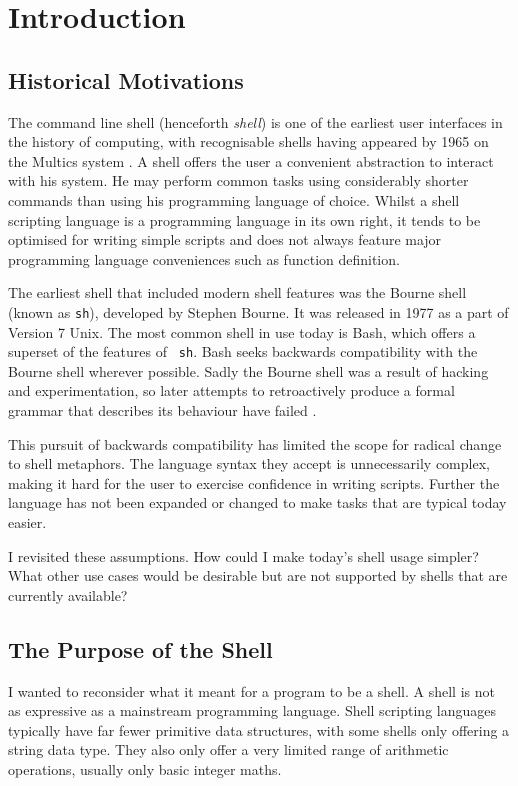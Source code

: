 \documentclass[12pt,twoside,notitlepage]{report}
\begin{document}
\cleardoublepage        %

\setcounter{page}{1}
\pagestyle{headings}

\chapter{Introduction}

\section{Historical Motivations}
The command line shell (henceforth \emph{shell}) is one of the
earliest user interfaces in the history of computing, with
recognisable shells having appeared by 1965 on the Multics system
\cite{multics}. A shell offers the user a convenient abstraction to
interact with his system. He may perform common tasks using
considerably shorter commands than using his programming language of
choice. Whilst a shell scripting language is a programming language in
its own right, it tends to be optimised for writing simple scripts and
does not always feature major programming language conveniences such
as function definition.

The earliest shell that included modern shell features was the Bourne
shell (known as {\tt sh}), developed by Stephen Bourne. It was
released in 1977 as a part of Version 7 Unix. The most common shell in
use today is Bash, which offers a superset of the features of {\tt
  sh}. Bash seeks backwards compatibility with the Bourne shell
wherever possible. Sadly the Bourne shell was a result of hacking and
experimentation, so later attempts to retroactively produce a formal
grammar that describes its behaviour have failed \cite{bourne}.

This pursuit of backwards compatibility has limited the scope for
radical change to shell metaphors. The language syntax they accept is
unnecessarily complex, making it hard for the user to exercise
confidence in writing scripts. Further the language has not been
expanded or changed to make tasks that are typical today easier.

I revisited these assumptions. How could I make today's shell usage
simpler? What other use cases would be desirable but are not supported
by shells that are currently available?

\section{The Purpose of the Shell}
I wanted to reconsider what it meant for a program to be a shell. A
shell is not as expressive as a mainstream programming language. Shell
scripting languages typically have far fewer primitive data
structures, with some shells only offering a string data type. They
also only offer a very limited range of arithmetic operations, usually
only basic integer maths.
\end{document}
